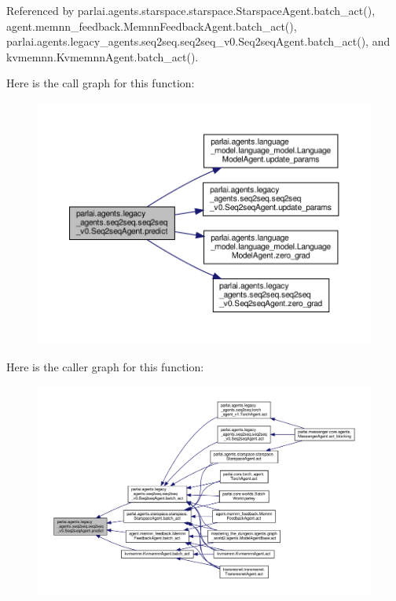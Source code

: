Referenced by parlai.\+agents.\+starspace.\+starspace.\+Starspace\+Agent.\+batch\+\_\+act(), agent.\+memnn\+\_\+feedback.\+Memnn\+Feedback\+Agent.\+batch\+\_\+act(), parlai.\+agents.\+legacy\+\_\+agents.\+seq2seq.\+seq2seq\+\_\+v0.\+Seq2seq\+Agent.\+batch\+\_\+act(), and kvmemnn.\+Kvmemnn\+Agent.\+batch\+\_\+act().

Here is the call graph for this function\+:
\nopagebreak
\begin{figure}[H]
\begin{center}
\leavevmode
\includegraphics[width=350pt]{classparlai_1_1agents_1_1legacy__agents_1_1seq2seq_1_1seq2seq__v0_1_1Seq2seqAgent_aadec879f7d8daa6451076e4fb358715b_cgraph}
\end{center}
\end{figure}
Here is the caller graph for this function\+:
\nopagebreak
\begin{figure}[H]
\begin{center}
\leavevmode
\includegraphics[width=350pt]{classparlai_1_1agents_1_1legacy__agents_1_1seq2seq_1_1seq2seq__v0_1_1Seq2seqAgent_aadec879f7d8daa6451076e4fb358715b_icgraph}
\end{center}
\end{figure}
